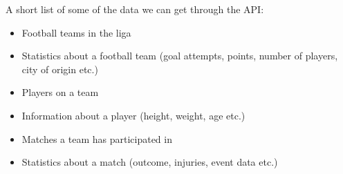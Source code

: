 \documentclass[Report.tex]{subfiles}
\begin{document}
A short list of some of the data we can get through the API:
\begin{itemize}
\item Football teams in the liga
\item Statistics about a football team (goal attempts, points, number of players, city of origin etc.)
\item Players on a team
\item Information about a player (height, weight, age etc.)
\item Matches a team has participated in
\item Statistics about a match (outcome, injuries, event data etc.)
\end{itemize}
\end{document}
